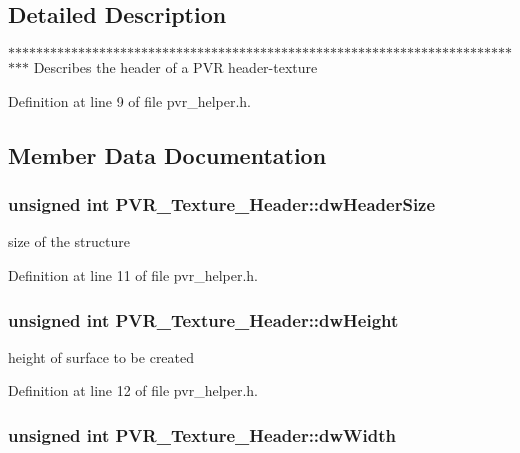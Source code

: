 \subsection{Detailed Description}
$\ast$$\ast$$\ast$$\ast$$\ast$$\ast$$\ast$$\ast$$\ast$$\ast$$\ast$$\ast$$\ast$$\ast$$\ast$$\ast$$\ast$$\ast$$\ast$$\ast$$\ast$$\ast$$\ast$$\ast$$\ast$$\ast$$\ast$$\ast$$\ast$$\ast$$\ast$$\ast$$\ast$$\ast$$\ast$$\ast$$\ast$$\ast$$\ast$$\ast$$\ast$$\ast$$\ast$$\ast$$\ast$$\ast$$\ast$$\ast$$\ast$$\ast$$\ast$$\ast$$\ast$$\ast$$\ast$$\ast$$\ast$$\ast$$\ast$$\ast$$\ast$$\ast$$\ast$$\ast$$\ast$$\ast$$\ast$$\ast$$\ast$$\ast$$\ast$$\ast$$\ast$$\ast$$\ast$ Describes the header of a PVR header-texture 

Definition at line 9 of file pvr\_\-helper.h.

\subsection{Member Data Documentation}
\hypertarget{struct_p_v_r___texture___header_1b70d66c96e4291a170028d0ba6bac0e}{
\subsubsection[dwHeaderSize]{\setlength{\rightskip}{0pt plus 5cm}unsigned int {\bf PVR\_\-Texture\_\-Header::dwHeaderSize}}}
\label{struct_p_v_r___texture___header_1b70d66c96e4291a170028d0ba6bac0e}


size of the structure 

Definition at line 11 of file pvr\_\-helper.h.\hypertarget{struct_p_v_r___texture___header_5c9d7a15be622005fae8247ea1d593df}{
\subsubsection[dwHeight]{\setlength{\rightskip}{0pt plus 5cm}unsigned int {\bf PVR\_\-Texture\_\-Header::dwHeight}}}
\label{struct_p_v_r___texture___header_5c9d7a15be622005fae8247ea1d593df}


height of surface to be created 

Definition at line 12 of file pvr\_\-helper.h.\hypertarget{struct_p_v_r___texture___header_35506d49c7fb8fe89cf2d35ec1727bdd}{
\subsubsection[dwWidth]{\setlength{\rightskip}{0pt plus 5cm}unsigned int {\bf PVR\_\-Texture\_\-Header::dwWidth}}}
\label{struct_p_v_r___texture___header_35506d49c7fb8fe89cf2d35ec1727bdd}


